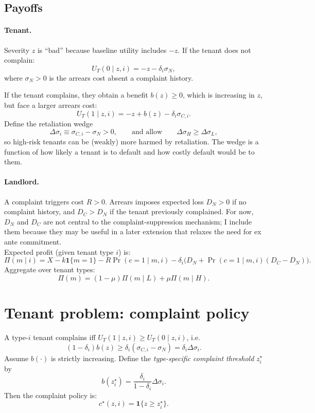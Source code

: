 \documentclass[11pt]{article}
\begin{document}
\subsection{Payoffs}

\paragraph{Tenant.}
Severity $z$ is ``bad'' because baseline utility includes $-z$. If the tenant does not complain:
\[
U_T(0\mid z,i)= -z - \delta_i\sigma_N,
\]
where $\sigma_N>0$ is the arrears cost absent a complaint history.

If the tenant complains, they obtain a benefit $b(z)\ge 0$, which is increasing in $z$, but face a larger arrears cost:
\[
U_T(1\mid z,i)= -z + b(z) - \delta_i\sigma_{C,i}.
\]
Define the retaliation wedge
\[
\Delta\sigma_i \equiv \sigma_{C,i}-\sigma_N>0,
\qquad \text{and allow}\qquad \Delta\sigma_H\ge \Delta\sigma_L,
\]
so high-risk tenants can be (weakly) more harmed by retaliation. The wedge is a function of how likely a tenant is to default and how costly default would be to them.

\paragraph{Landlord.}
A complaint triggers cost $R>0$. Arrears imposes expected loss $D_N>0$ if no complaint history, and $D_C>D_N$ if the tenant previously complained. For now, $D_N$ and $D_C$ are not central to the complaint-suppression mechanism; I include them because they may be useful in a later extension that relaxes the need for ex ante commitment.\\
Expected profit (given tenant type $i$) is:
\[
\Pi(m\mid i)
= X - k\mathbf 1\{m=1\}
- R\Pr(c=1\mid m,i)
- \delta_i\Big(D_N + \Pr(c=1\mid m,i)(D_C-D_N)\Big).
\]
Aggregate over tenant types:
\[
\Pi(m)= (1-\mu)\Pi(m\mid L) + \mu\Pi(m\mid H).
\]

\section{Tenant problem: complaint policy}

A type-$i$ tenant complains iff $U_T(1\mid z,i)\ge U_T(0\mid z,i)$, i.e.
\[
(1-\delta_i)b(z)\ge \delta_i(\sigma_{C,i}-\sigma_N)=\delta_i\Delta\sigma_i.
\]
Assume $b(\cdot)$ is strictly increasing. Define the \emph{type-specific complaint threshold} $z_i^\star$ by
\[
b(z_i^\star)=\frac{\delta_i}{1-\delta_i}\Delta\sigma_i.
\]
Then the complaint policy is:
\[
c^\star(z,i)=\mathbf 1\{z\ge z_i^\star\}.
\]
\end{document}
